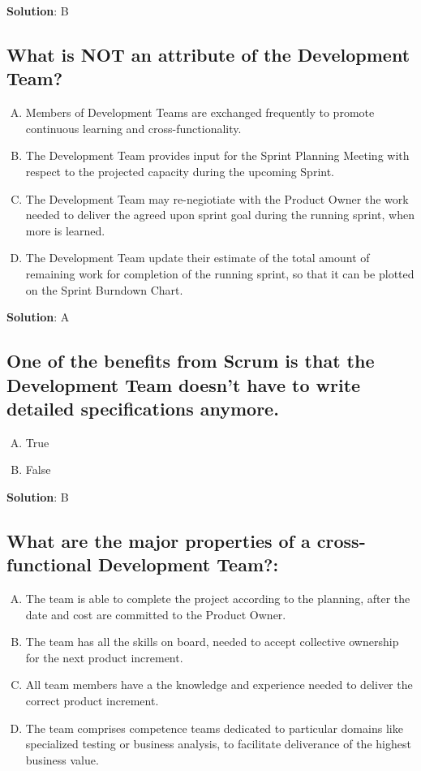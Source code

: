 \textbf{Solution}: B


\subsection{What is NOT an attribute of the Development Team?}
\begin{enumerate}[A)]
  \item Members of Development Teams are exchanged frequently to promote continuous learning and cross-functionality.
  \item The Development Team provides input for the Sprint Planning Meeting with respect to the projected capacity during the upcoming Sprint.
  \item The Development Team may re-negiotiate with the Product Owner the work needed to deliver the agreed upon sprint goal during the running sprint, when more is learned.
  \item The Development Team update their estimate of the total amount of remaining work for completion of the running sprint, so that it can be plotted on the Sprint Burndown Chart.
\end{enumerate}


\textbf{Solution}: A


\subsection{One of the benefits from Scrum is that the Development Team doesn't have to write detailed specifications anymore.}
\begin{enumerate}[A)]
  \item True
  \item False
\end{enumerate}


\textbf{Solution}: B


\subsection{What are the major properties of a cross-functional Development Team?:}
\begin{enumerate}[A)]
  \item The team is able to complete the project according to the planning,
    after the date and cost are committed to the Product Owner.
  \item The team has all the skills on board, needed to accept collective
    ownership for the next product increment.
  \item All team members have a the knowledge and experience needed
    to deliver the correct product increment.
  \item The team comprises competence teams dedicated to particular
    domains like specialized testing or business analysis, to facilitate
    deliverance of the highest business value.
\end{enumerate}


